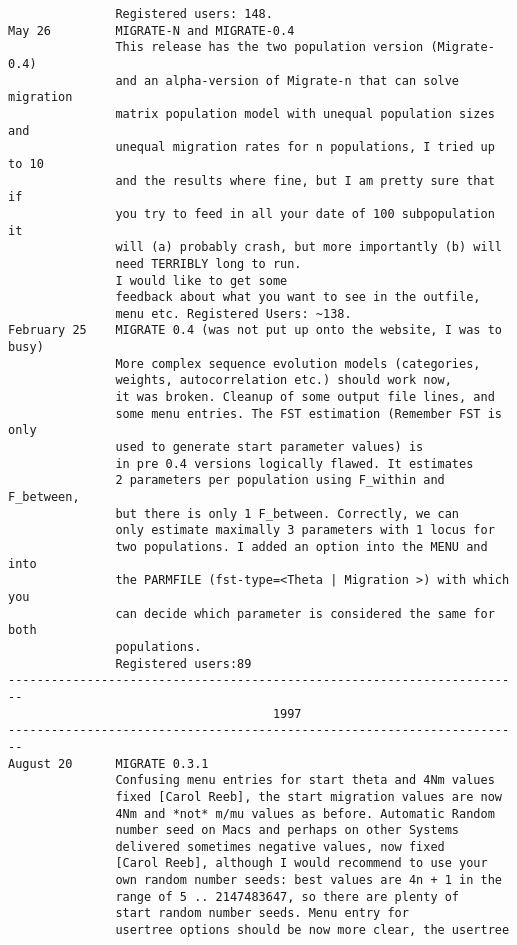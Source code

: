 \begin{small}
\begin{verbatim}
               Registered users: 148.
May 26         MIGRATE-N and MIGRATE-0.4
               This release has the two population version (Migrate-0.4) 
               and an alpha-version of Migrate-n that can solve migration
               matrix population model with unequal population sizes and
               unequal migration rates for n populations, I tried up to 10
               and the results where fine, but I am pretty sure that if 
               you try to feed in all your date of 100 subpopulation it
               will (a) probably crash, but more importantly (b) will
               need TERRIBLY long to run. 
               I would like to get some 
               feedback about what you want to see in the outfile,
               menu etc. Registered Users: ~138.
February 25    MIGRATE 0.4 (was not put up onto the website, I was to busy)
               More complex sequence evolution models (categories,
               weights, autocorrelation etc.) should work now, 
               it was broken. Cleanup of some output file lines, and
               some menu entries. The FST estimation (Remember FST is only 
               used to generate start parameter values) is 
               in pre 0.4 versions logically flawed. It estimates 
               2 parameters per population using F_within and F_between,
               but there is only 1 F_between. Correctly, we can
               only estimate maximally 3 parameters with 1 locus for
               two populations. I added an option into the MENU and into
               the PARMFILE (fst-type=<Theta | Migration >) with which you 
               can decide which parameter is considered the same for both
               populations.
               Registered users:89
------------------------------------------------------------------------
                                     1997
------------------------------------------------------------------------
August 20      MIGRATE 0.3.1
               Confusing menu entries for start theta and 4Nm values
               fixed [Carol Reeb], the start migration values are now
               4Nm and *not* m/mu values as before. Automatic Random
               number seed on Macs and perhaps on other Systems 
               delivered sometimes negative values, now fixed 
               [Carol Reeb], although I would recommend to use your
               own random number seeds: best values are 4n + 1 in the 
               range of 5 .. 2147483647, so there are plenty of 
               start random number seeds. Menu entry for
               usertree options should be now more clear, the usertree

\end{verbatim}
\end{small}
